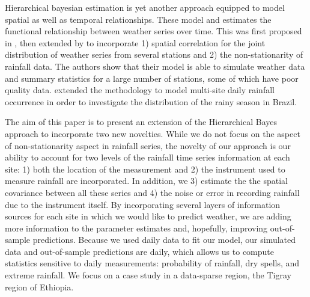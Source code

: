 \documentclass[12pt]{article}
\begin{document}
Hierarchical bayesian estimation is yet another approach equipped to model spatial as well as temporal relationships.  These model and estimates the functional relationship between weather series over time. This was first proposed in \citet{Sans2015}, then extended by \citet{Sanso2000} to incorporate 1) spatial correlation for the joint distribution of weather series from several stations and 2) the non-stationarity of rainfall data. The authors show that their model is able to simulate weather data and summary statistics for a large number of stations, some of which have poor quality data. \citet{Lima2015} extended the methodology to model multi-site daily rainfall occurrence in order to investigate the distribution of the rainy season in Brazil.   

The aim of this paper is to present an extension of the Hierarchical Bayes approach to incorporate two new novelties. While we do not focus on the aspect of non-stationarity aspect in rainfall series, the novelty of our approach is our ability to account for two levels of the rainfall time series information at each site: 1) both the location of the measurement and 2) the instrument used to measure rainfall are incorporated. In addition, we 3) estimate the the spatial covariance between all these series and 4) the noise or error in recording rainfall due to the instrument itself. By incorporating several layers of information sources for each site in which we would like to predict weather, we are adding more information to the parameter estimates and, hopefully, improving out-of-sample predictions. Because we used daily data to fit our model, our simulated data and out-of-sample predictions are daily, which allows us to compute statistics sensitive to daily measurements: probability of rainfall, dry spells, and extreme rainfall.  We focus on a case study in a data-sparse region, the Tigray region of Ethiopia.


\end{document}
